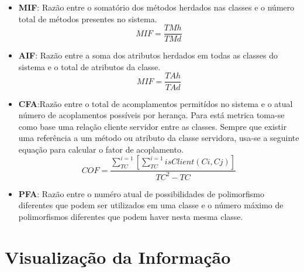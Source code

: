 \begin{itemize}
\item \textbf{MIF}: Razão entre o somatório dos métodos herdados nas classes e o número total de métodos presentes no sistema.
\begin{equation}
MIF = \frac{TMh}{TMd}
\end{equation}
\item \textbf{AIF}: Razão entre a soma dos atributos herdados em todas as classes do sistema e o total de atributos da classe.
\begin{equation}
MIF = \frac{TAh}{TAd}
\end{equation}
\item \textbf{CFA}:Razão entre o total de acomplamentos permitídos no sistema e o atual número de acoplamentos possíveis por herança. Para está metrica toma-se como base uma relação cliente servidor entre as classes. Sempre que existir uma referência a um método ou atributo da classe servidora, usa-se a seguinte equação para calcular o fator de acoplamento.
\begin{equation}
COF = \frac{\sum_{TC}^{i=1}[\sum_{TC}^{i=1}isClient(Ci,Cj)]}{TC^2-TC}
\end{equation}
\item \textbf{PFA}: Razão entre o numéro atual de possibilidades de polimorfismo diferentes que podem ser utilizados em uma classe e o número máximo de polimorfismos diferentes que podem haver nesta mesma classe.
\end{itemize}

\section{Visualização da Informação}
